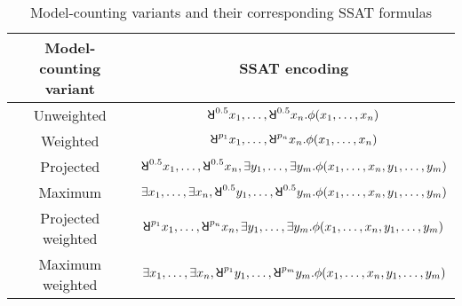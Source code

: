 \begin{table}[t]
    \centering
    \caption{Model-counting variants and their corresponding SSAT formulas}
    \label{tbl:related-work-model-counting}
    \begin{tabular}{c|c}
        Model-counting variant & SSAT encoding                                                                                              \\
        \hline
        Unweighted             & $\random{0.5}x_1,\ldots,\random{0.5}x_n.\pf(x_1,\ldots,x_n)$                                               \\
        Weighted               & $\random{p_1}x_1,\ldots,\random{p_n}x_n.\pf(x_1,\ldots,x_n)$                                               \\
        Projected              & $\random{0.5}x_1,\ldots,\random{0.5}x_n,\exists y_1,\ldots,\exists y_m.\pf(x_1,\ldots,x_n,y_1,\ldots,y_m)$ \\
        Maximum                & $\exists x_1,\ldots,\exists x_n,\random{0.5}y_1,\ldots,\random{0.5}y_m.\pf(x_1,\ldots,x_n,y_1,\ldots,y_m)$ \\
        Projected weighted     & $\random{p_1}x_1,\ldots,\random{p_n}x_n,\exists y_1,\ldots,\exists y_m.\pf(x_1,\ldots,x_n,y_1,\ldots,y_m)$ \\
        Maximum weighted       & $\exists x_1,\ldots,\exists x_n,\random{p_1}y_1,\ldots,\random{p_m}y_m.\pf(x_1,\ldots,x_n,y_1,\ldots,y_m)$ \\
    \end{tabular}
\end{table}